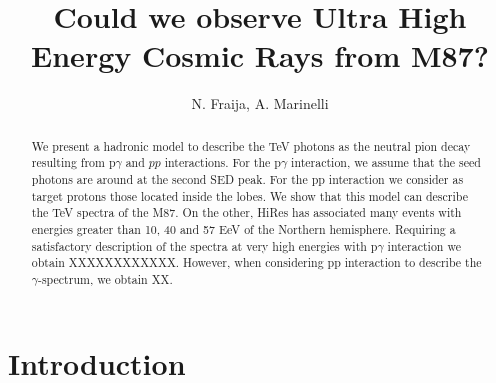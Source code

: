 \documentclass[preprint, twocolumn,secnumarabic,amssymb, nobibnotes, aps, prd]{revtex4-1}
\begin{document}
\title{Could we observe Ultra High Energy Cosmic Rays from  M87?}%

\author{N. Fraija,  A. Marinelli}%

\begin{abstract}
We present a hadronic model to describe the TeV photons as the neutral pion decay resulting from p$\gamma$ and $pp$ interactions. For the p$\gamma$ interaction, we  assume that the seed photons  are  around  at the second SED peak. For the pp interaction we consider as target protons those located inside  the  lobes.  We show that this model can describe the TeV spectra of the  M87.  On the other, HiRes has associated many events with energies greater than 10, 40 and 57 EeV of the Northern hemisphere.  Requiring a satisfactory description of the spectra at very high energies with p$\gamma$ interaction we obtain  XXXXXXXXXXXX. However, when considering  pp interaction to describe the $\gamma$-spectrum,  we obtain XX.
\end{abstract}

\maketitle






\section{Introduction}
\end{document}
